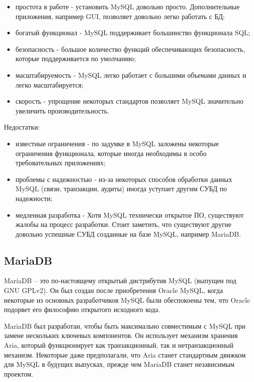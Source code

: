 \begin{itemize}
  \item простота в работе - установить MySQL довольно просто. Дополнительные приложения, например GUI, позволяет довольно легко работать с БД;
  \item богатый функционал - MySQL поддерживает большинство функционала SQL;
  \item безопасность - большое количество функций обеспечивающих безопасность, которые поддерживается по умолчанию;
  \item масштабируемость - MySQL легко работает с большими объемами данных и легко масштабируется;
  \item скорость - упрощение некоторых стандартов позволяет MySQL значительно увеличить производительность.
\end{itemize}

\hspace{0cm} Недостатки:

\begin{itemize}
  \item известные ограничения - по задумке в MySQL заложены некоторые ограничения функционала, которые иногда необходимы в особо требовательных приложениях;
  \item проблемы с надежностью - из-за некоторых способов обработки данных MySQL (связи, транзакции, аудиты) иногда уступает другим СУБД по надежности;
  \item медленная разработка - Хотя MySQL технически открытое ПО, существуют жалобы на процесс разработки. Стоит заметить, что существуют другие довольно успешные СУБД созданные на базе MySQL, например MariaDB.
\end{itemize}

\subsection{MariaDB}

\hspace{0cm} MariaDB – это по-настоящему открытый дистрибутив MySQL (выпущен под GNU GPLv2). Он был создан после приобретения Oracle MySQL, когда некоторые из основных разработчиков MySQL были обеспокоены тем, что Oracle подорвет его философию открытого исходного кода.

\hspace{0cm} MariaDB был разработан, чтобы быть максимально совместимым с MySQL при замене нескольких ключевых компонентов. Он использует механизм хранения Aria, который функционирует как транзакционный, так и нетранзакционный механизм. Некоторые даже предполагали, что Aria станет стандартным движком для MySQL в будущих выпусках, прежде чем MariaDB станет независимым проектом\cite{web:MariaDB}.

